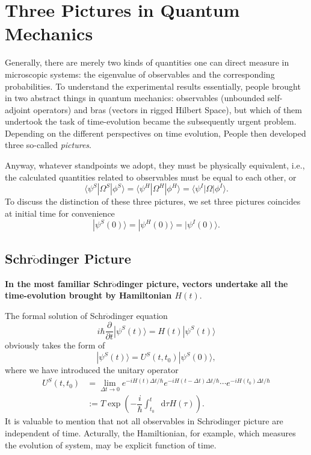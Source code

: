 \documentclass[b5paper,10pt,UTF8]{book}
\newcommand*\dd{\mathop{}\!\mathrm{d}}
\numberwithin{equation}{section}
\begin{document}
	\section{Three Pictures in Quantum Mechanics}

		Generally, there are merely two kinds of quantities one can direct measure in microscopic systems: the eigenvalue of observables and the corresponding probabilities. To understand the experimental results essentially, people brought in two abstract things in quantum mechanics: observables (unbounded self-adjoint operators) and bras (vectors in rigged Hilbert Space), but which of them undertook the task of time-evolution became the subsequently urgent problem. Depending on the different perspectives on time evolution, People then developed three so-called \emph{pictures}.\par
		Anyway, whatever standpoints we adopt, they must be physically equivalent, i.e., the calculated quantities related to observables must be equal to each other, or
		\begin{equation}\label{1.0.1}
			\langle\psi^S|\Omega^S|\phi^S\rangle=\langle\psi^H|\Omega^H|\phi^H\rangle=\langle\psi^I|\Omega|\phi^I\rangle.
		\end{equation}
		To discuss the distinction of these three pictures, we set three pictures coincides at initial time for convenience
		$$|\psi^S(0)\rangle=|\psi^H(0)\rangle=|\psi^I(0)\rangle.$$


		\subsection{Schr$\ddot{\text{o}}$dinger Picture}
			\textbf{In the most familiar Schr$\ddot{\text{o}}$dinger picture, vectors undertake all the time-evolution brought by Hamiltonian $H(t)$}. \par
			The formal solution of Schr$\ddot{\text{o}}$dinger equation
			\begin{equation}\label{1.1.1}
				i\hbar\dfrac{\partial}{\partial t}|\psi^S(t)\rangle=H(t)|\psi^S(t)\rangle
			\end{equation}
			obviously takes the form of
			\begin{equation}\label{1.1.2}
			|\psi^S(t)\rangle=U^S(t,t_0)|\psi^S(0)\rangle,
			\end{equation}
			where we have introduced the unitary operator
			\begin{align*}
				U^S(t,t_0)&=\lim_{\Delta t\rightarrow0}e^{-iH(t)\Delta t/\hbar}e^{-iH(t-\Delta t)\Delta t/\hbar}\cdots e^{-iH(t_0)\Delta t/\hbar}\\
				&:=T\exp\left(-\dfrac{i}{\hbar}\int_{t_0}^t \dd\tau H(\tau)\right).
			\end{align*}
			\indent It is valuable to mention that not all observables in Schr$\ddot{\text{o}}$dinger picture are independent of time. Acturally, the Hamiltionian, for example, which measures the evolution of system, may be explicit function of time.
\end{document}
